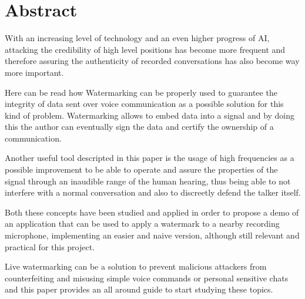 \chapter*{Abstract}
With an increasing level of technology and an even higher progress of AI, attacking the credibility of high level positions has become more frequent and therefore assuring the authenticity of recorded conversations has also become way more important.


Here can be read how Watermarking can be properly used to guarantee the integrity of data sent over voice communication as a possible solution for this kind of problem.
Watermarking allows to embed data into a signal and by doing this the author can eventually sign the data and certify the ownership of a communication.


Another useful tool descripted in this paper is the usage of high frequencies as a possible improvement to be able to operate and assure the properties of the signal through an inaudible range of the human hearing, thus being able to not interfere with a normal conversation and also to discreetly defend the talker itself.


Both these concepts have been studied and applied in order to propose a demo of an application that can be used to apply a watermark to a nearby recording microphone, implementing an easier and naive version, although still relevant and practical for this project.


Live watermarking can be a solution to prevent malicious attackers from counterfeiting and misusing simple voice commands or personal sensitive chats and this paper provides an all around guide to start studying these topics.




